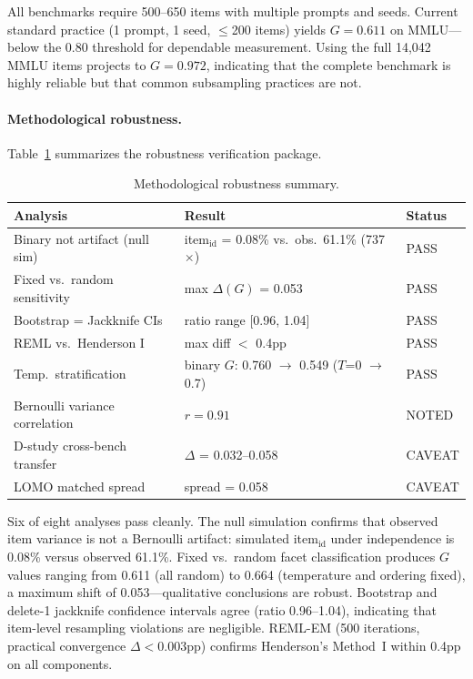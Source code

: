 \documentclass[letterpaper]{article}
\begin{document}
All benchmarks require 500--650 items with multiple prompts and seeds.
Current standard practice (1 prompt, 1 seed, $\leq$200 items) yields $G = 0.611$ on MMLU---below the 0.80 threshold for dependable measurement.
Using the full 14,042 MMLU items projects to $G = 0.972$, indicating that the complete benchmark is highly reliable but that common subsampling practices are not.

\paragraph{Methodological robustness.}
Table~\ref{tab:robustness} summarizes the robustness verification package.

\begin{table}[t]
\centering
\caption{Methodological robustness summary.}
\label{tab:robustness}
\begin{tabular}{lll}
\toprule
Analysis & Result & Status \\
\midrule
Binary not artifact (null sim) & item$_{\text{id}}$ = 0.08\% vs.\ obs.\ 61.1\% (737$\times$) & PASS \\
Fixed vs.\ random sensitivity  & max $\Delta(G)$ = 0.053 & PASS \\
Bootstrap = Jackknife CIs      & ratio range [0.96, 1.04] & PASS \\
REML vs.\ Henderson I          & max diff $<$ 0.4pp & PASS \\
Temp.\ stratification           & binary $G$: 0.760 $\to$ 0.549 ($T$=0 $\to$ 0.7) & PASS \\
Bernoulli variance correlation & $r = 0.91$ & NOTED \\
D-study cross-bench transfer   & $\Delta$ = 0.032--0.058 & CAVEAT \\
LOMO matched spread            & spread = 0.058 & CAVEAT \\
\bottomrule
\end{tabular}
\end{table}
\label{sec:robustness}

Six of eight analyses pass cleanly.
The null simulation confirms that observed item variance is not a Bernoulli artifact: simulated item$_{\text{id}}$ under independence is 0.08\% versus observed 61.1\%.
Fixed vs.\ random facet classification produces $G$ values ranging from 0.611 (all random) to 0.664 (temperature and ordering fixed), a maximum shift of 0.053---qualitative conclusions are robust.
Bootstrap and delete-1 jackknife confidence intervals agree (ratio 0.96--1.04), indicating that item-level resampling violations are negligible.
REML-EM (500 iterations, practical convergence $\Delta < 0.003$pp) confirms Henderson's Method~I within 0.4pp on all components.
\end{document}
